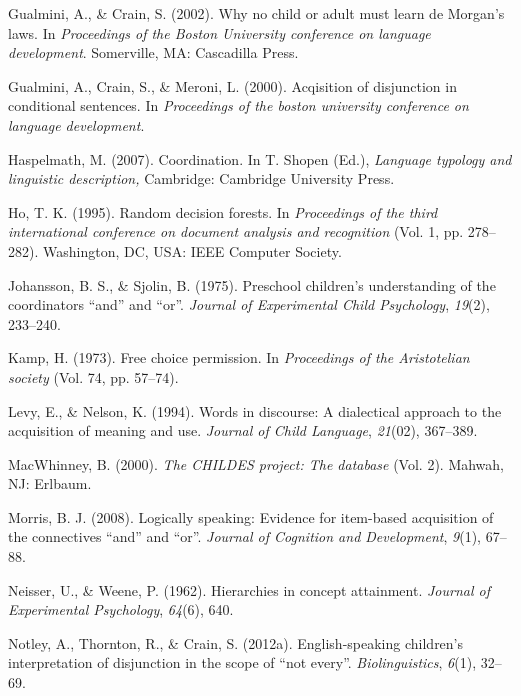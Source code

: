 \documentclass[,man,floatsintext]{apa6}
\begin{document}
\leavevmode\hypertarget{ref-gualminicrain2002}{}%
Gualmini, A., \& Crain, S. (2002). Why no child or adult must learn de Morgan's laws. In \emph{Proceedings of the Boston University conference on language development}. Somerville, MA: Cascadilla Press.

\leavevmode\hypertarget{ref-gualmini2000}{}%
Gualmini, A., Crain, S., \& Meroni, L. (2000). Acqisition of disjunction in conditional sentences. In \emph{Proceedings of the boston university conference on language development}.

\leavevmode\hypertarget{ref-haspelmath2007}{}%
Haspelmath, M. (2007). Coordination. In T. Shopen (Ed.), \emph{Language typology and linguistic description,} Cambridge: Cambridge University Press.

\leavevmode\hypertarget{ref-ho1995random}{}%
Ho, T. K. (1995). Random decision forests. In \emph{Proceedings of the third international conference on document analysis and recognition} (Vol. 1, pp. 278--282). Washington, DC, USA: IEEE Computer Society.

\leavevmode\hypertarget{ref-johansson1975preschool}{}%
Johansson, B. S., \& Sjolin, B. (1975). Preschool children's understanding of the coordinators ``and'' and ``or''. \emph{Journal of Experimental Child Psychology}, \emph{19}(2), 233--240.

\leavevmode\hypertarget{ref-kamp1973free}{}%
Kamp, H. (1973). Free choice permission. In \emph{Proceedings of the Aristotelian society} (Vol. 74, pp. 57--74).

\leavevmode\hypertarget{ref-levy1994words}{}%
Levy, E., \& Nelson, K. (1994). Words in discourse: A dialectical approach to the acquisition of meaning and use. \emph{Journal of Child Language}, \emph{21}(02), 367--389.

\leavevmode\hypertarget{ref-macwhinney2000childes}{}%
MacWhinney, B. (2000). \emph{The CHILDES project: The database} (Vol. 2). Mahwah, NJ: Erlbaum.

\leavevmode\hypertarget{ref-morris2008logically}{}%
Morris, B. J. (2008). Logically speaking: Evidence for item-based acquisition of the connectives ``and'' and ``or''. \emph{Journal of Cognition and Development}, \emph{9}(1), 67--88.

\leavevmode\hypertarget{ref-neisser1962hierarchies}{}%
Neisser, U., \& Weene, P. (1962). Hierarchies in concept attainment. \emph{Journal of Experimental Psychology}, \emph{64}(6), 640.

\leavevmode\hypertarget{ref-notley2012notevery}{}%
Notley, A., Thornton, R., \& Crain, S. (2012a). English-speaking children's interpretation of disjunction in the scope of ``not every''. \emph{Biolinguistics}, \emph{6}(1), 32--69.
\end{document}
